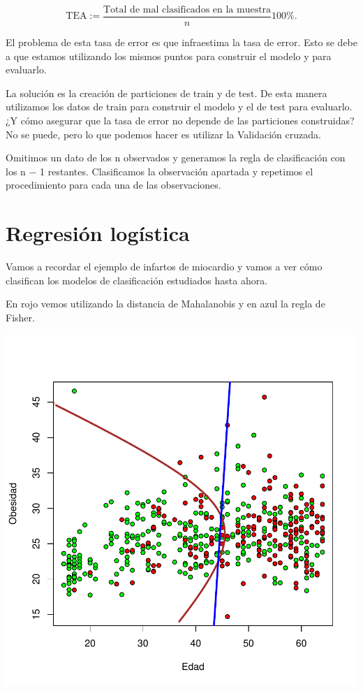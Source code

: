 \begin{defn}
$$\text{TEA}:=\frac{\text{Total de mal clasificados en la muestra}}{n}100\%.$$
\end{defn}

El problema de esta tasa de error es que infraestima la tasa de error. Esto se debe a que estamos utilizando los mismos puntos para construir el modelo y para evaluarlo. 

La solución es la creación de particiones de train y de test. De esta manera utilizamos los datos de train para construir el modelo y el de test para evaluarlo. ¿Y cómo asegurar que la tasa de error no depende de las particiones construidas? No se puede, pero lo que podemos hacer es utilizar la Validación cruzada.

\begin{defn}Omitimos un dato de los n observados y generamos la regla de clasificación con los n − 1 restantes. Clasificamos la observación apartada y repetimos el procedimiento para cada una de las observaciones.
\end{defn}


\section{Regresión logística}

Vamos a recordar el ejemplo de infartos de miocardio y vamos a ver cómo clasifican los modelos de clasificación estudiados hasta ahora.

En rojo vemos utilizando la distancia de Mahalanobis y en azul la regla de Fisher.
\centerline{\includegraphics[width=13 cm]{pdf/tema4/_edadobesidad-reglas}}

